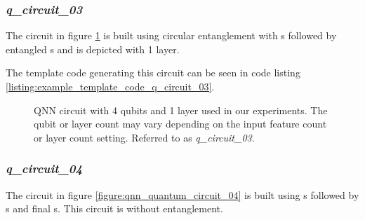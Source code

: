 \subsubsection{\textit{q\_circuit\_03}}
\label{subsubsection:qnn_quantum_circuit_03}
The circuit in figure \ref{figure:qnn_quantum_circuit_03} is built using circular entanglement with \rygate s followed by entangled \czgate s and is depicted with 1 layer.

The template code generating this circuit can be seen in code listing \ref{listing:example_template_code_q_circuit_03}.

\begin{figure}[!h]
	\centering
	\caption{QNN circuit with 4 qubits and 1 layer used in our experiments. The qubit or layer count may vary depending on the input feature count or layer count setting. Referred to as \textit{q\_circuit\_03}.}
	\label{figure:qnn_quantum_circuit_03}
\end{figure}

\clearpage

\subsubsection{\textit{q\_circuit\_04}}
\label{subsubsection:qnn_quantum_circuit_04}
The circuit in figure \ref{figure:qnn_quantum_circuit_04} is built using \rxgate s followed by \rygate s and final \rzgate s. This circuit is without entanglement.

